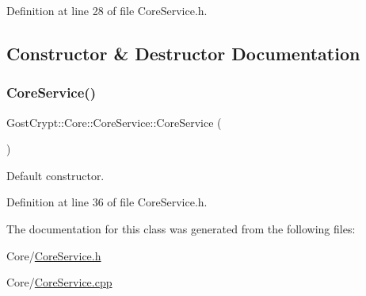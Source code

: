 Definition at line 28 of file Core\+Service.\+h.



\subsection{Constructor \& Destructor Documentation}
\mbox{\label{class_gost_crypt_1_1_core_1_1_core_service_a80d73796811b735b24116d111c616e31}} 
\subsubsection{\texorpdfstring{Core\+Service()}{CoreService()}}
{\footnotesize\ttfamily Gost\+Crypt\+::\+Core\+::\+Core\+Service\+::\+Core\+Service (\begin{DoxyParamCaption}{ }\end{DoxyParamCaption})\hspace{0.3cm}{\ttfamily [inline]}}



Default constructor. 



Definition at line 36 of file Core\+Service.\+h.



The documentation for this class was generated from the following files\+:\begin{DoxyCompactItemize}
\item 
Core/\hyperlink{_core_service_8h}{Core\+Service.\+h}\item 
Core/\hyperlink{_core_service_8cpp}{Core\+Service.\+cpp}\end{DoxyCompactItemize}
